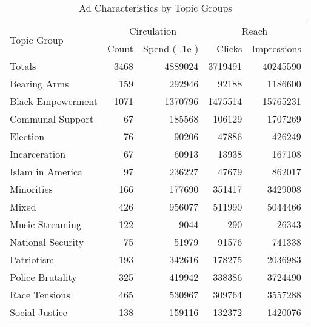 \documentclass{article}
\def\Ruble{\stackengine{.67ex}{%
	\stackengine{.48ex}{\textsf{P}}{\rule{.8ex}{.12ex}\kern.6ex}{O}{r}{F}{F}{L}%
	}{\rule{.8ex}{.12ex}\kern.6ex}{O}{r}{F}{F}{L}\kern-.1e
}
\begin{document}
\begin{table}[h]\centering
	\caption{Ad Characteristics by Topic Groups}
	\begin{tabular}{lrrrr}
		\toprule
		\multirow{2}[3]{*}{Topic Group} & \multicolumn{2}{c}{Circulation} & \multicolumn{2}{c}{Reach} \\
		\cmidrule(lr){2-3} \cmidrule(lr){4-5}
		                  & Count      & Spend (\Ruble) & Clicks        & Impressions    \\
		\midrule
		Totals            & \num{3468} & \num{4889024}  & \num{3719491} & \num{40245590} \\ 
		\midrule
		Bearing Arms      & \num{159}  & \num{292946}   & \num{92188}   & \num{1186600}  \\
		Black Empowerment & \num{1071} & \num{1370796}  & \num{1475514} & \num{15765231} \\
		Communal Support  & \num{67}   & \num{185568}   & \num{106129}  & \num{1707269}  \\
		Election          & \num{76}   & \num{90206}    & \num{47886}   & \num{426249}   \\
		Incarceration     & \num{67}   & \num{60913}    & \num{13938}   & \num{167108}   \\
		Islam in America  & \num{97}   & \num{236227}   & \num{47679}   & \num{862017}   \\
		Minorities        & \num{166}  & \num{177690}   & \num{351417}  & \num{3429008}  \\
		Mixed             & \num{426}  & \num{956077}   & \num{511990}  & \num{5044466}  \\
		Music Streaming   & \num{122}  & \num{9044}     & \num{290}     & \num{26343}    \\
		National Security & \num{75}   & \num{51979}    & \num{91576}   & \num{741338}   \\
		Patriotism        & \num{193}  & \num{342616}   & \num{178275}  & \num{2036983}  \\
		Police Brutality  & \num{325}  & \num{419942}   & \num{338386}  & \num{3724490}  \\
		Race Tensions     & \num{465}  & \num{530967}   & \num{309764}  & \num{3557288}  \\
		Social Justice    & \num{138}  & \num{159116}   & \num{132372}  & \num{1420076}  \\
		\bottomrule
	\end{tabular}
\end{table}

\clearpage
\end{document}
